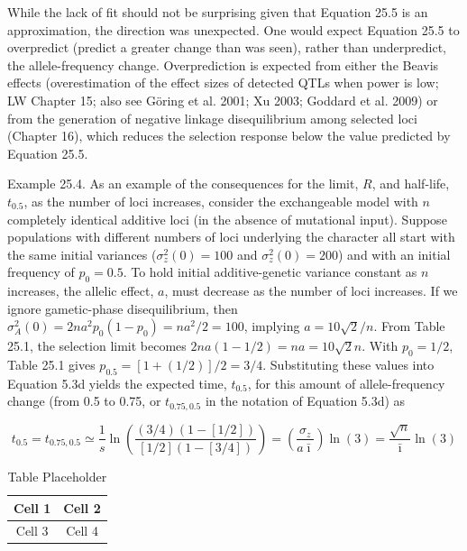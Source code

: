 \documentclass{article}
\begin{document}
While the lack of fit should not be surprising given that Equation 25.5 is an approximation, the direction was unexpected. One would expect Equation 25.5 to overpredict (predict a greater change than was seen), rather than underpredict, the allele-frequency change. Overprediction is expected from either the Beavis effects (overestimation of the effect sizes of detected QTLs when power is low; LW Chapter 15; also see Göring et al. 2001; Xu 2003; Goddard et al. 2009) or from the generation of negative linkage disequilibrium among selected loci (Chapter 16), which reduces the selection response below the value predicted by Equation 25.5.

Example 25.4. As an example of the consequences for the limit, $R$, and half-life, $t_{0.5}$, as the number of loci increases, consider the exchangeable model with $n$ completely identical additive loci (in the absence of mutational input). Suppose populations with different numbers of loci underlying the character all start with the same initial variances ($\sigma_z^2(0) = 100$ and $\sigma_z^2(0) = 200$) and with an initial frequency of $p_0 = 0.5$. To hold initial additive-genetic variance constant as $n$ increases, the allelic effect, $a$, must decrease as the number of loci increases. If we ignore gametic-phase disequilibrium, then $\sigma_A^2(0) = 2na^2p_0(1 - p_0) = na^2/2 = 100$, implying $a = 10\sqrt{2}/n$. From Table 25.1, the selection limit becomes $2na(1 - 1/2) = na = 10\sqrt{2}n$. With $p_0 = 1/2$, Table 25.1 gives $p_{0.5} = [1 + (1/2)]/2 = 3/4$. Substituting these values into Equation 5.3d yields the expected time, $t_{0.5}$, for this amount of allele-frequency change (from 0.5 to 0.75, or $t_{0.75,0.5}$ in the notation of Equation 5.3d) as

\begin{equation}
t_{0.5}=t_{0.75,0.5}\simeq\frac{1}{s}\ln\left(\frac{\left(3/4\right)\left(1-\left[1/2\right]\right)}{\left[1/2\right]\left(1-\left[3/4\right]\right)}\right)=\left(\frac{\sigma_{z}}{a\bar{\imath}}\right)\ln(3)=\frac{\sqrt{n}}{\bar{\imath}}\ln(3)
\end{equation}

\begin{table}[h]
\centering
\begin{tabular}{|c|c|}
\hline
Cell 1 & Cell 2 \\
\hline
Cell 3 & Cell 4 \\
\hline
\end{tabular}
\caption{Table Placeholder}
\end{table}
\end{document}
